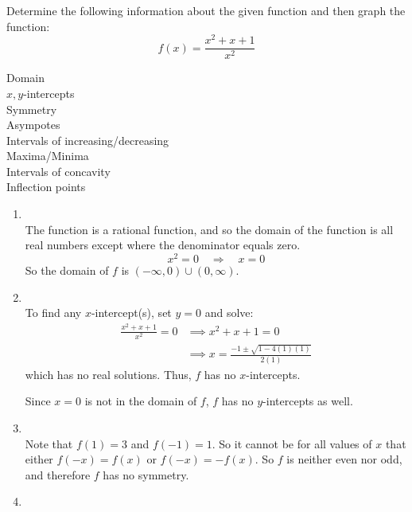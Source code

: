 \documentclass[nooutcomes,handout]{ximera}
\begin{document}
\begin{problem}

  Determine the following information about the given function and then graph the function:
  \[ 
    f(x) = \frac{x^2 + x + 1}{x^2}
  \]
  
  Domain\\
  $x,y$-intercepts\\
  Symmetry\\
  Asympotes\\
  Intervals of increasing/decreasing\\
  Maxima/Minima\\
  Intervals of concavity\\
  Inflection points
  
  \begin{freeResponse}
    \mbox{}
    \begin{enumerate}
      \item  
          \\
        
        The function is a rational function, and so the domain of the function is all real numbers except where the denominator equals zero.
        \[
          x^2 = 0 \quad \Longrightarrow \quad x=0
        \]
	So the domain of $f$ is $(-\infty ,0)\cup (0,\infty )$.


      \item
          \\
        To find any $x$-intercept(s), set $y=0$ and solve:
        \begin{align*}
          \frac{x^2 + x + 1}{x^2} = 0 &\implies x^2 + x + 1 = 0 \\
          &\implies x = \frac{-1 \pm \sqrt{1-4(1)(1)}}{2(1)}
        \end{align*}
	which has no real solutions.
        Thus, $f$ has no $x$-intercepts.
			
	Since $x=0$ is not in the domain of $f$, $f$ has no $y$-intercepts as well.
 
     \item 
         \\

       Note that $f(1) = 3$ and $f(-1) = 1$.
       So it cannot be for all values of $x$ that either $f(-x) = f(x)$ or $f(-x) = -f(x)$.
       So $f$ is neither even nor odd, and therefore $f$ has no symmetry.
			
     \item
         \\


\end{enumerate}
\end{freeResponse}
\end{problem}
\end{document}
